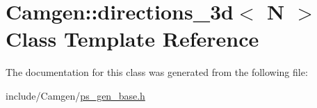 \hypertarget{a00132}{}\section{Camgen\+:\+:directions\+\_\+3d$<$ N $>$ Class Template Reference}
\label{a00132}


The documentation for this class was generated from the following file\+:\begin{DoxyCompactItemize}
\item 
include/\+Camgen/\hyperlink{a00743}{ps\+\_\+gen\+\_\+base.\+h}\end{DoxyCompactItemize}
